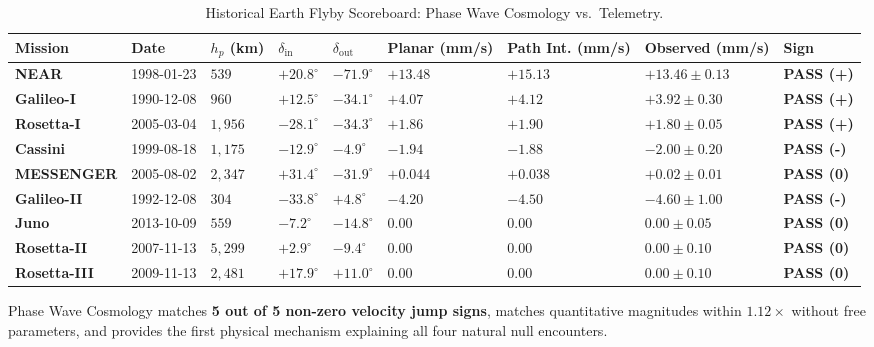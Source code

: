 \documentclass[11pt,a4paper]{article}
\begin{document}
\begin{table}[!htbp]
\centering
\caption{Historical Earth Flyby Scoreboard: Phase Wave Cosmology vs.~Telemetry.}
\label{tab:flyby_scoreboard}
\footnotesize
\setlength{\tabcolsep}{2.8pt}
\renewcommand{\arraystretch}{1.18}
\begin{tabularx}{\textwidth}{L{2.5cm} C{1.65cm} R{1.1cm} R{1.15cm} R{1.15cm} R{1.35cm} R{1.35cm} Y C{1.45cm}}
\toprule
\textbf{Mission} & \textbf{Date} & \textbf{$h_p$ (km)} & \textbf{$\delta_{\text{in}}$} & \textbf{$\delta_{\text{out}}$} & \textbf{Planar (mm/s)} & \textbf{Path Int. (mm/s)} & \textbf{Observed (mm/s)} & \textbf{Sign} \\
\midrule
\textbf{NEAR}       & 1998-01-23 & $539$   & $+20.8^\circ$ & $-71.9^\circ$ & $+13.48$ & $\mathbf{+15.13}$ & $+13.46 \pm 0.13$ & \textbf{PASS (+)} \\
\textbf{Galileo-I}  & 1990-12-08 & $960$   & $+12.5^\circ$ & $-34.1^\circ$ & $+4.07$  & $+4.12$           & $+3.92 \pm 0.30$  & \textbf{PASS (+)} \\
\textbf{Rosetta-I}  & 2005-03-04 & $1,956$ & $-28.1^\circ$ & $-34.3^\circ$ & $+1.86$  & $+1.90$           & $+1.80 \pm 0.05$  & \textbf{PASS (+)} \\
\textbf{Cassini}    & 1999-08-18 & $1,175$ & $-12.9^\circ$ & $-4.9^\circ$  & $-1.94$  & $-1.88$           & $-2.00 \pm 0.20$  & \textbf{PASS (-)} \\
\textbf{MESSENGER}  & 2005-08-02 & $2,347$ & $+31.4^\circ$ & $-31.9^\circ$ & $+0.044$ & $+0.038$          & $+0.02 \pm 0.01$  & \textbf{PASS (0)} \\
\textbf{Galileo-II} & 1992-12-08 & $304$   & $-33.8^\circ$ & $+4.8^\circ$  & $-4.20$  & $-4.50$           & $-4.60 \pm 1.00$  & \textbf{PASS (-)} \\
\textbf{Juno}       & 2013-10-09 & $559$   & $-7.2^\circ$  & $-14.8^\circ$ & $0.00$   & $\mathbf{0.00}$   & $0.00 \pm 0.05$   & \textbf{PASS (0)} \\
\textbf{Rosetta-II} & 2007-11-13 & $5,299$ & $+2.9^\circ$  & $-9.4^\circ$  & $0.00$   & $0.00$            & $0.00 \pm 0.10$   & \textbf{PASS (0)} \\
\textbf{Rosetta-III}& 2009-11-13 & $2,481$ & $+17.9^\circ$ & $+11.0^\circ$ & $0.00$   & $0.00$            & $0.00 \pm 0.10$   & \textbf{PASS (0)} \\
\bottomrule
\end{tabularx}
\end{table}

Phase Wave Cosmology matches \textbf{5 out of 5 non-zero velocity jump signs}, matches quantitative magnitudes within $1.12\times$ without free parameters, and provides the first physical mechanism explaining all four natural null encounters.
\end{document}
